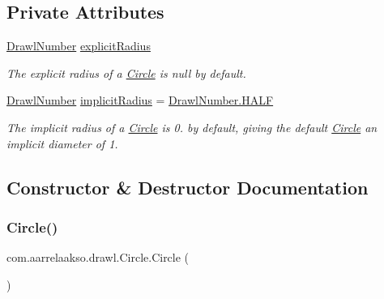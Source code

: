 \subsection*{Private Attributes}
\begin{DoxyCompactItemize}
\item 
\hyperlink{classcom_1_1aarrelaakso_1_1drawl_1_1_drawl_number}{Drawl\+Number} \hyperlink{classcom_1_1aarrelaakso_1_1drawl_1_1_circle_a125baa27e0cf2e667361e0637cd82e7c}{explicit\+Radius}
\begin{DoxyCompactList}\small\item\em The explicit radius of a \hyperlink{classcom_1_1aarrelaakso_1_1drawl_1_1_circle}{Circle} is null by default. \end{DoxyCompactList}\item 
\hyperlink{classcom_1_1aarrelaakso_1_1drawl_1_1_drawl_number}{Drawl\+Number} \hyperlink{classcom_1_1aarrelaakso_1_1drawl_1_1_circle_afb7f13978788e711c490cec96e9f899a}{implicit\+Radius} = \hyperlink{classcom_1_1aarrelaakso_1_1drawl_1_1_drawl_number_ae0980b8dd35b0bb52b87b37700d15322}{Drawl\+Number.\+H\+A\+LF}
\begin{DoxyCompactList}\small\item\em The implicit radius of a \hyperlink{classcom_1_1aarrelaakso_1_1drawl_1_1_circle}{Circle} is 0. by default, giving the default \hyperlink{classcom_1_1aarrelaakso_1_1drawl_1_1_circle}{Circle} an implicit diameter of 1. \end{DoxyCompactList}\end{DoxyCompactItemize}


\subsection{Constructor \& Destructor Documentation}
\mbox{\label{classcom_1_1aarrelaakso_1_1drawl_1_1_circle_a18cd01a953d72d49941bc8211f50d268}} 
\subsubsection{\texorpdfstring{Circle()}{Circle()}\hspace{0.1cm}{\footnotesize\ttfamily [1/2]}}
{\footnotesize\ttfamily com.\+aarrelaakso.\+drawl.\+Circle.\+Circle (\begin{DoxyParamCaption}{ }\end{DoxyParamCaption})}




